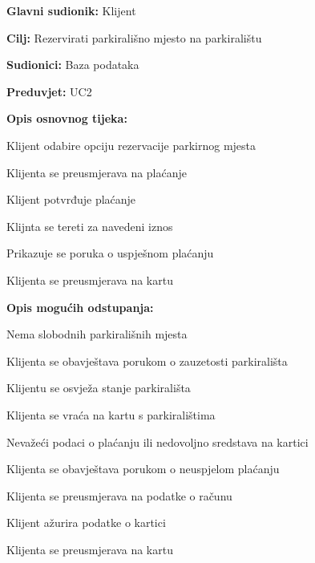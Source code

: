 \noindent {}
\begin{packed_item}
	
	\item \textbf{Glavni sudionik:} Klijent
	\item  \textbf{Cilj:} Rezervirati parkirališno mjesto na parkiralištu
	\item  \textbf{Sudionici:} Baza podataka
	\item  \textbf{Preduvjet:} UC2
	\item  \textbf{Opis osnovnog tijeka:}
	
	\item[] \begin{packed_enum}
		
		\item Klijent odabire opciju rezervacije parkirnog mjesta
		\item Klijenta se preusmjerava na plaćanje
		\item Klijent potvrđuje plaćanje
		\item Klijnta se tereti za navedeni iznos
		\item Prikazuje se poruka o uspješnom plaćanju
		\item Klijenta se preusmjerava na kartu
		
	\item  \textbf{Opis mogućih odstupanja:}
	
	\item[] \begin{packed_item}
		
		\item[1.a] Nema slobodnih parkirališnih mjesta
		\item[] \begin{packed_enum}
			
			\item Klijenta se obavještava porukom o zauzetosti parkirališta
			\item Klijentu se osvježa stanje parkirališta
			\item Klijenta se vraća na kartu s parkiralištima
			
		\end{packed_enum}
		
		\item[3.a] Nevažeći podaci o plaćanju ili nedovoljno sredstava na kartici
		\item[] \begin{packed_enum}
			
			\item Klijenta se obavještava porukom o neuspjelom plaćanju
			\item Klijenta se preusmjerava na podatke o računu
			\item Klijent ažurira podatke o kartici
			\item Klijenta se preusmjerava na kartu
			
		\end{packed_enum}
		
	\end{packed_item}
		
	\end{packed_enum}
\end{packed_item}

